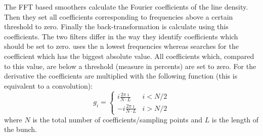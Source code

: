 The FFT based smoothers calculate the Fourier coefficients of the line density. Then they set all coefficients corresponding to frequencies above a certain threshold to zero. Finally the back-transformation is calculate using this coefficients. The two filters differ in the way they identify coefficients which should be set to zero.  uses the n lowest frequencies whereas  searches for the coefficient which has the biggest absolute value. All coefficients which, compared to this value, are below a threshold (measure in percents) are set to zero. For the derivative the coefficients are multiplied with the following function (this is equivalent to a convolution):
$$g_{i} =
\begin{cases}
i \frac{2\pi \imath}{N\cdot L} & i < N/2 \\
-i \frac{2\pi \imath}{N\cdot L} & i > N/2
\end{cases}$$
where $N$ is the total number of coefficients/sampling points and $L$ is the length of the bunch.

